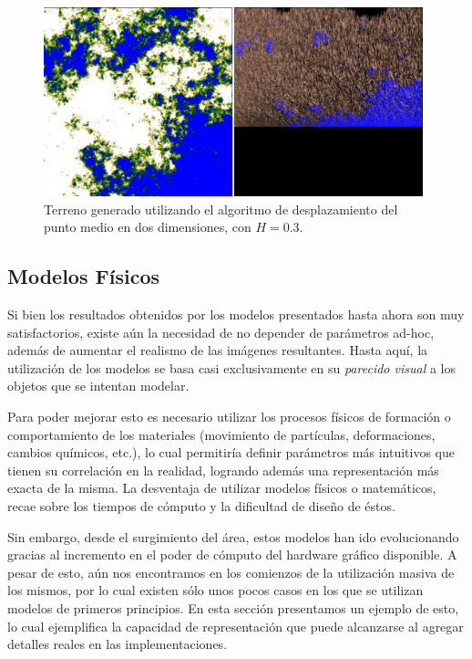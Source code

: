 \begin{figure}
\center
\includegraphics[width=11cm]{figures/terreno2}
\caption[Terreno generado utilizando el algoritmo de desplazamiento del punto medio en dos dimensiones, con $H = 0.3$]{Terreno generado utilizando el algoritmo de desplazamiento del punto medio en dos dimensiones, con $H = 0.3$.}
\label{fg:terreno2}
\end{figure}



\subsection{Modelos Físicos}
Si bien los resultados obtenidos por los modelos presentados hasta ahora son muy satisfactorios, existe aún la necesidad de no depender de parámetros ad-hoc, además de aumentar el realismo de las imágenes resultantes.
Hasta aquí, la utilización de los modelos se basa casi exclusivamente en su {\em parecido visual} a los objetos que se intentan modelar.

Para poder mejorar esto es necesario utilizar los procesos físicos de formación o comportamiento de los materiales (movimiento de partículas, deformaciones, cambios químicos, etc.), lo cual permitiría definir parámetros más intuitivos que tienen su correlación en la realidad, logrando además una representación más exacta de la misma.
La desventaja de utilizar modelos físicos o matemáticos, recae sobre los tiempos de cómputo y la dificultad de diseño de éstos.

Sin embargo, desde el surgimiento del área, estos modelos han ido evolucionando gracias al incremento en el poder de cómputo del hardware gráfico disponible. A pesar de esto, aún nos encontramos en los comienzos de la utilización masiva de los mismos, por lo cual existen sólo unos pocos casos en los que se utilizan modelos de primeros principios.
En esta sección presentamos un ejemplo de esto, lo cual ejemplifica la capacidad de representación que puede alcanzarse al agregar detalles reales en las implementaciones.

